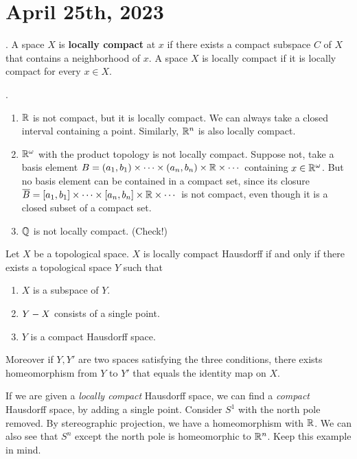 \section*{April 25th, 2023}


.  A space \(X\) is \textbf{locally compact} at \(x\) if there exists a compact subspace \(C\) of \(X\) that contains a neighborhood of \(x\). A space \(X\) is locally compact if it is locally compact for every \(x \in X\).

\ex.
\begin{enumerate}
    \item \(\mathbb{R}\) is not compact, but it is locally compact. We can always take a closed interval containing a point. Similarly, \(\mathbb{R}^n\) is also locally compact.
    \item \(\mathbb{R}^\omega\) with the product topology is not locally compact. Suppose not, take a basis element \(B = (a_1, b_1) \times \cdots \times (a_n, b_n) \times \mathbb{R} \times \cdots\) containing \(x \in \mathbb{R}^\omega\). But no basis element can be contained in a compact set, since its closure \(\overline{B} = [a_1, b_1] \times \cdots \times [a_n, b_n] \times \mathbb{R} \times \cdots\) is not compact, even though it is a closed subset of a compact set.
    \item \(\mathbb{Q}\) is not locally compact. (Check!)
\end{enumerate}

 Let \(X\) be a topological space. \(X\) is locally compact Hausdorff if and only if there exists a topological space \(Y\) such that
\begin{enumerate}
    \item \(X\) is a subspace of \(Y\).
    \item \(Y - X\) consists of a single point.
    \item \(Y\) is a compact Hausdorff space.
\end{enumerate}
Moreover if \(Y, Y'\) are two spaces satisfying the three conditions, there exists homeomorphism from \(Y\) to \(Y'\) that equals the identity map on \(X\).

\rmk If we are given a \textit{locally compact} Hausdorff space, we can find a \textit{compact} Hausdorff space, by adding a single point. Consider \(S^1\) with the north pole removed. By stereographic projection, we have a homeomorphism with \(\mathbb{R}\). We can also see that \(S^n\) except the north pole is homeomorphic to \(\mathbb{R}^n\). Keep this example in mind.

